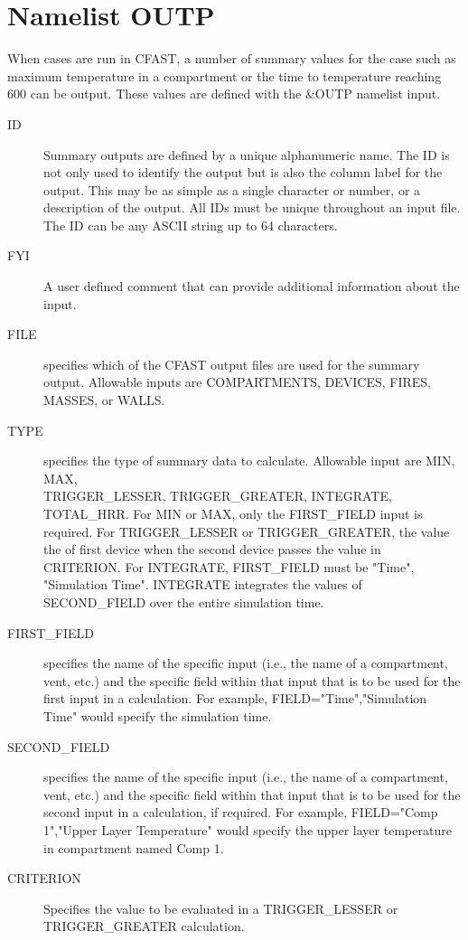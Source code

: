 \documentclass[12pt,twoside]{book}
\begin{document}
\section{Namelist OUTP}

When cases are run in CFAST, a number of summary values for the case such as maximum temperature in a compartment or the time to temperature reaching 600 \degc can be output. These values are defined with the {\ct \&OUTP} namelist input.

\begin{description}
  \item[ID] Summary outputs are defined by a unique alphanumeric name. The ID is not only used to identify the output but is also the column label for the output. This may be as simple as a single character or number, or a description of the output. All IDs must be unique throughout an input file.  The { \ct ID} can be any ASCII string up to 64 characters.
  \item[FYI] A user defined comment that can provide additional information about the input.
  \item[FILE] specifies which of the CFAST output files are used for the summary output. Allowable inputs are {\ct COMPARTMENTS}, {\ct DEVICES}, {\ct FIRES}, {\ct MASSES}, or {\ct WALLS}.
  \item[TYPE] specifies the type of summary data to calculate. Allowable input are {\ct MIN}, {\ct MAX}, \\
      {\ct TRIGGER\_LESSER}, {\ct TRIGGER\_GREATER}, {\ct INTEGRATE}, {\ct TOTAL\_HRR}. For {\ct MIN} or {\ct MAX}, only the {\ct FIRST\_FIELD} input is required. For {\ct TRIGGER\_LESSER} or {\ct TRIGGER\_GREATER}, the value the of first device when the second device passes the value in {\ct CRITERION}. For {\ct INTEGRATE}, {\ct FIRST\_FIELD} must be {\ct "Time", "Simulation Time"}. {\ct INTEGRATE} integrates the values of {\ct SECOND\_FIELD} over the entire simulation time.
  \item[FIRST\_FIELD] specifies the name of the specific input (i.e., the name of a compartment, vent, etc.) and the specific field within that input that is to be used for the first input in a calculation. For example, {\ct FIELD="Time","Simulation Time"} would specify the simulation time.
  \item[SECOND\_FIELD] specifies the name of the specific input (i.e., the name of a compartment, vent, etc.) and the specific field within that input that is to be used for the second input in a calculation, if required. For example, {\ct FIELD="Comp 1","Upper Layer Temperature"} would specify the upper layer temperature in compartment named {\ct Comp 1}.
  \item[CRITERION] Specifies the value to be evaluated in a {\ct TRIGGER\_LESSER} or {\ct TRIGGER\_GREATER} calculation.
\end{description}
\end{document}
